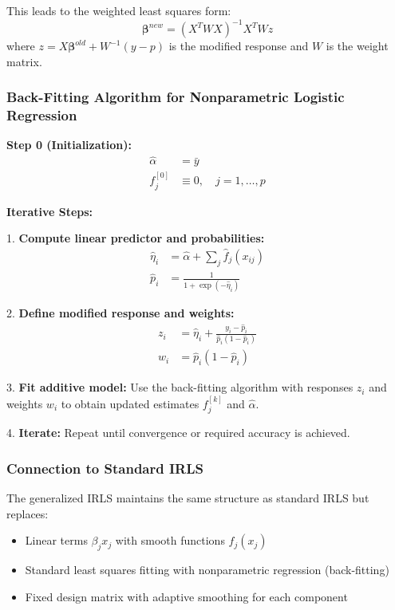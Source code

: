 \documentclass[12pt,a4paper]{article}
\begin{document}
This leads to the weighted least squares form:
\begin{equation}
\boldsymbol{\beta}^{new} = (X^T W X)^{-1} X^T W z
\end{equation}
where $z = X\boldsymbol{\beta}^{old} + W^{-1}(y - p)$ is the modified response and $W$ is the weight matrix.

\subsubsection{Back-Fitting Algorithm for Nonparametric Logistic Regression}

\textbf{Step 0 (Initialization):}
\begin{align}
\hat{\alpha} &= \bar{y} \\
f_j^{[0]} &\equiv 0, \quad j = 1, \ldots, p
\end{align}

\textbf{Iterative Steps:}

1. \textbf{Compute linear predictor and probabilities:}
\begin{align}
\hat{\eta}_i &= \hat{\alpha} + \sum_j \hat{f}_j(x_{ij}) \\
\hat{p}_i &= \frac{1}{1 + \exp(-\hat{\eta}_i)}
\end{align}

2. \textbf{Define modified response and weights:}
\begin{align}
z_i &= \hat{\eta}_i + \frac{y_i - \hat{p}_i}{\hat{p}_i(1 - \hat{p}_i)} \\
w_i &= \hat{p}_i(1 - \hat{p}_i)
\end{align}

3. \textbf{Fit additive model:} Use the back-fitting algorithm with responses $z_i$ and weights $w_i$ to obtain updated estimates $f_j^{[k]}$ and $\hat{\alpha}$.

4. \textbf{Iterate:} Repeat until convergence or required accuracy is achieved.

\subsubsection{Connection to Standard IRLS}

The generalized IRLS maintains the same structure as standard IRLS but replaces:
\begin{itemize}
    \item Linear terms $\beta_j x_j$ with smooth functions $f_j(x_j)$
    \item Standard least squares fitting with nonparametric regression (back-fitting)
    \item Fixed design matrix with adaptive smoothing for each component
\end{itemize}
\end{document}
